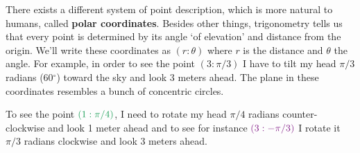 \documentclass[a4paper,11pt]{article}
\newcommand{\clg}{\textcolor{ForestGreen}}
\newcommand{\clm}{\textcolor{Fuchsia}}
\begin{document}
There exists a different system of point description, which is more natural to
humans, called \textbf{polar coordinates}. Besides other things, trigonometry
tells us that every point is determined by its angle `of elevation' and distance
from the origin. We'll write these coordinates as $(r:\theta)$ where $r$ is the
distance and $\theta$ the angle. For example, in order to see the point $(3:\pi
/ 3)$ I have to tilt my head $\pi / 3$ radians (60$^{\circ}$) toward the sky and
look 3 meters ahead. The plane in these coordinates resembles a bunch of
concentric circles.
\begin{center}
\end{center}
To see the point $\clg{(1:\pi / 4)}$, I need to rotate my head $\pi / 4$ radians
counter-clockwise and look 1 meter ahead and to see for instance $\clm{(3:-\pi /
3)}$ I rotate it $\pi / 3$ radians clockwise and look 3 meters ahead.
\end{document}
